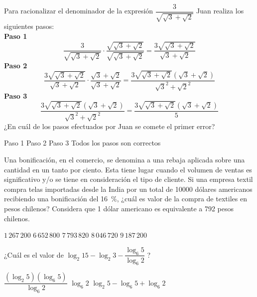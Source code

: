 \documentclass[sin nombre]{srs}
\begin{document}
\begin{preguntas}[after-item-skip=1cm]
\pregunta Para racionalizar el denominador de la expresión $\dfrac{3}{\sqrt{\sqrt{3}+\sqrt{2}}}$ Juan realiza los siguientes pasos:\\[5pt]
\textbf{Paso 1}
\begin{equation*}
\dfrac{3}{\sqrt{\sqrt{3}+\sqrt{2}}} \cdot \dfrac{\sqrt{\sqrt{3}+\sqrt{2}}}{\sqrt{\sqrt{3}+\sqrt{2}}} = \dfrac{3\sqrt{\sqrt{3}+\sqrt{2}}}{\sqrt{3}+\sqrt{2}}
\end{equation*}
\textbf{Paso 2}
\begin{equation*}
\dfrac{3\sqrt{\sqrt{3}+\sqrt{2}}}{\sqrt{3}+\sqrt{2}}\cdot\dfrac{\sqrt{3}+\sqrt{2}}{\sqrt{3}+\sqrt{2}} = \dfrac{3\sqrt{\sqrt{3}+\sqrt{2}}\left(\sqrt{3}+\sqrt{2}\right)}{\sqrt{3}^2+\sqrt{2}^2}
\end{equation*}
\textbf{Paso 3}
\begin{equation*}
 \dfrac{3\sqrt{\sqrt{3}+\sqrt{2}}\left(\sqrt{3}+\sqrt{2}\right)}{\sqrt{3}^2+\sqrt{2}^2} =  \dfrac{3\sqrt{\sqrt{3}+\sqrt{2}}\left(\sqrt{3}+\sqrt{2}\right)}{5}
\end{equation*}
¿En cuál de los pasos efectuados por Juan se comete el primer error?
\begin{vertical}
\alternativa Paso 1
\alternativa Paso 2
\alternativa Paso 3
\alternativa Todos los pasos son correctos
\end{vertical}

\pregunta Una bonificación, en el comercio, se denomina a una rebaja aplicada
sobre una cantidad en un tanto por ciento. Esta tiene lugar cuando el
volumen de ventas es significativo y/o se tiene en consideración el
tipo de cliente. Si una empresa textil compra telas importadas desde
la India por un total de 10000 dólares americanos recibiendo una
bonificación del \mbox{16 \%}, ¿cuál es valor de la compra de textiles en
pesos chilenos? Considera que 1 dólar americano es equivalente a 792 pesos
chilenos.
\begin{vertical}
\alternativa $1\,267\,200$
\alternativa $6\,652\,800$
\alternativa $7\,793\,820$
\alternativa $8\,046\,720$
\alternativa $9\,187\,200$
\end{vertical}

\pregunta ¿Cuál es el valor de $\log_2 15 - \log_2 3 - \dfrac{\log_6 5}{\log_6 2}$ ?
\begin{vertical}
\alternativa $\dfrac{\left(\log_2 5\right)\left(\log_6 5\right)}{\log_6 2}$
\alternativa $\log_6 2$
\alternativa $\log_2 5 - \log_6 5 + \log_6 2$
\end{vertical}


\end{preguntas}
\end{document}
